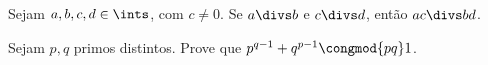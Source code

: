 \begin{exercise}
  Sejam $a,b,c,d \in \ints$, com $c \neq 0$. Se $a \divs b$ e $c \divs d$,
  ent\~ao $ac \divs bd$.
\end{exercise}

\begin{exercise}
  Sejam $p,q$ primos distintos. Prove que $p^{q-1} + q^{p-1} \congmod {pq} 1$.
\end{exercise}
